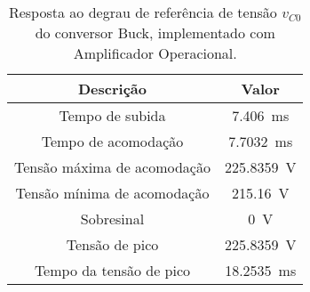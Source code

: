 \begin{table}[!ht]
\centering
\caption{Resposta ao degrau de referência de tensão $v_{C0}$ do conversor Buck, implementado com Amplificador Operacional.}
\label{tab:parametros}
\begin{tabular}{@{}cc@{}}
\toprule
\textbf{Descrição} & \textbf{Valor}\\ \midrule
Tempo de subida & \SI{7.406}{\milli\s}\\
Tempo de acomodação & \SI{7.7032}{\milli\s}\\
Tensão máxima de acomodação & \SI{225.8359}{\V}\\
Tensão mínima de acomodação & \SI{215.16}{\V}\\
Sobresinal & \SI{0}{\V}\\
Tensão de pico & \SI{225.8359}{\V}\\
Tempo da tensão de pico & \SI{18.2535}{\milli\s}\\
\bottomrule
\end{tabular}
\end{table}

